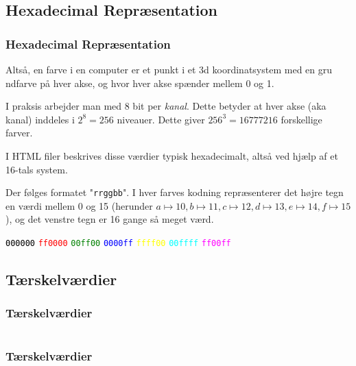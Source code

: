 \subsection{Hexadecimal Repræsentation}
\begin{frame}
    \frametitle{Hexadecimal Repræsentation}
    \vspace{3mm}
    Altså, en farve i en computer er et punkt i et 3d koordinatsystem med en gru ndfarve på hver akse, og hvor hver akse spænder mellem 0 og 1.
    
    \vspace{5mm}
    I praksis arbejder man med 8 bit per \textsl{kanal}. Dette betyder at hver akse (aka kanal) inddeles i $2^8=256$ niveauer. Dette giver $256^3=16777216$ forskellige farver.
    
    \vspace{5mm}
    I HTML filer beskrives disse værdier typisk hexadecimalt, altså ved hjælp af et 16-tals system. 
    
    \vspace{5mm}
    Der følges formatet "\texttt{rrggbb}". I hver farves kodning repræsenterer det højre tegn en værdi mellem 0 og 15 (herunder ${a\mapsto 10, b \mapsto 11, c \mapsto 12, d \mapsto 13, e \mapsto 14, f \mapsto 15}$), og det venstre tegn er 16 gange så meget værd.
    
     \vspace{5mm}
     \textcolor{black}{\texttt{000000}}
     \textcolor{red}{\texttt{ff0000}}
     \textcolor{green}{\texttt{00ff00}}
     \textcolor{blue}{\texttt{0000ff}}
     \textcolor{yellow}{\texttt{ffff00}}
     \textcolor{cyan}{\texttt{00ffff}}
     \textcolor{magenta}{\texttt{ff00ff}}
\end{frame}


\subsection{Tærskelværdier}
\begin{frame}
    \frametitle{Tærskelværdier}
    \vspace{-2mm}
    \inputminted[fontsize=\tiny,highlightlines={}]{javascript}{../src/frontend/part5_threshold/logic.js}
\end{frame}
\begin{frame}
    \frametitle{Tærskelværdier}
    \vspace{-2mm}
    \inputminted[fontsize=\tiny,highlightlines={9-15,26}]{javascript}{../src/frontend/part5_threshold/logic.js}
\end{frame}

